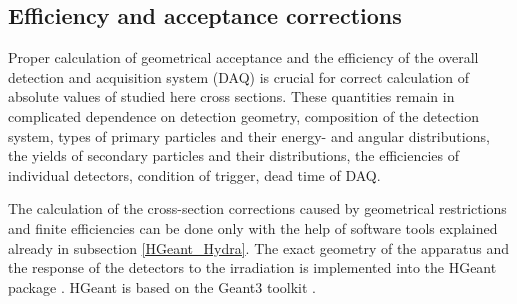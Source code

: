 % 
% 	
% 


\subsection{\label{Eff_corr} Efficiency and acceptance corrections}
Proper calculation of geometrical acceptance and the efficiency of
the overall detection and acquisition system (DAQ) is crucial for
correct calculation of absolute values of studied here cross
sections. These quantities remain in complicated dependence on
detection geometry, composition of the detection system, types of
primary particles and their energy- and angular distributions, the
yields of secondary particles and their distributions, the
efficiencies of individual detectors, condition of trigger, dead time of DAQ.

The calculation of the cross-section corrections caused by geometrical
restrictions and finite efficiencies can be done only with the help
of software tools explained already in subsection \ref{HGeant_Hydra}. The exact
geometry of the apparatus and the response of the detectors to the
irradiation is implemented into the HGeant package \cite{HGeant}. HGeant is
based on the Geant3 toolkit \cite{brun1993geant}.

